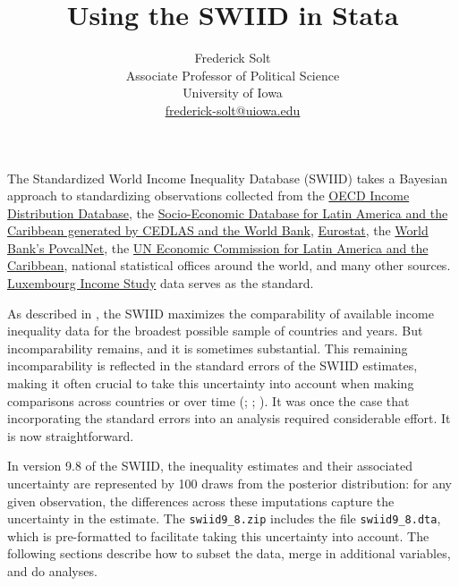 \documentclass[11pt]{article}
\begin{document}
\title{Using the SWIID in Stata}
\author{
Frederick Solt\\
  Associate Professor of Political Science\\
  University of Iowa\\
  \href{mailto:frederick-solt@uiowa.edu}{frederick-solt@uiowa.edu}}
\date{}
\maketitle 

The Standardized World Income Inequality Database (SWIID) takes a Bayesian approach to standardizing observations collected from the \href{http://www.oecd.org/social/inequality.htm}{OECD Income Distribution Database}, the \href{http://sedlac.econo.unlp.edu.ar/eng/}{Socio-Economic Database for Latin America and the Caribbean generated by CEDLAS and the World Bank}, \href{http://epp.eurostat.ec.europa.eu}{Eurostat}, the \href{http://iresearch.worldbank.org/PovcalNet/index.htm}{World Bank's PovcalNet}, the \href{http://interwp.cepal.org/sisgen/ConsultaIntegrada.asp?idIndicador=250\&idioma=e}{UN Economic Commission for Latin America and the Caribbean}, national statistical offices around the world, and many other sources.  \href{http://www.lisdatacenter.org}{Luxembourg Income Study} data serves as the standard.  

As described in \citet{Solt2020}, the SWIID maximizes the comparability of available income inequality data for the broadest possible sample of countries and years.  But incomparability remains, and it is sometimes substantial.  This remaining incomparability is reflected in the standard errors of the SWIID estimates, making it often crucial to take this uncertainty into account when making comparisons across countries or over time (\citealt[238]{Solt2009}; \citealt[14]{Solt2016_nv}; \citealt{Solt2020}).  It was once the case that incorporating the standard errors into an analysis required considerable effort.  It is now straightforward.

In version 9.8 of the SWIID, the inequality estimates and their associated uncertainty are represented by 100 draws from the posterior
distribution: for any given observation, the differences across these imputations capture the uncertainty in the estimate.  The \verb+swiid9_8.zip+ includes the file \verb+swiid9_8.dta+, which is pre-formatted to facilitate taking this uncertainty into account.  The following sections describe how to subset the data, merge in additional variables, and do analyses.
\end{document}
